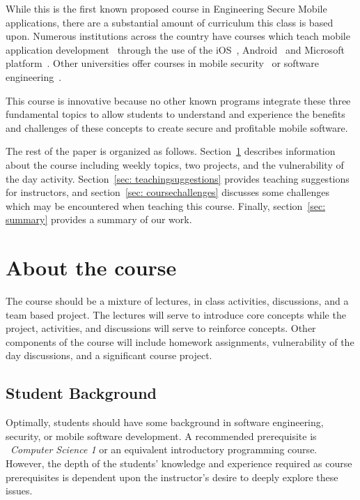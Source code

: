 \documentclass{sig-alternate}
\begin{document}
While this is the first known proposed course in Engineering Secure Mobile applications, there are a substantial amount of curriculum this class is based upon. Numerous institutions across the country have courses which teach mobile application development~\cite{mobiledevelop_11} through the use of the iOS~\cite{ios_develop_url}, Android~\cite{androiddevel_url} and Microsoft platform~\cite{mobileappdesign_url}. Other universities offer courses in mobile security~\cite{mobilesecurity_URL} or software engineering~\cite{rit_url}.

This course is innovative because no other known programs integrate these three fundamental topics to allow students to understand and experience the benefits and challenges of these concepts to create secure and profitable mobile software.

The rest of the paper is organized as follows. Section~\ref{sec: aboutcourse} describes information about the course including weekly topics, two projects, and the vulnerability of the day activity. Section~\ref{sec: teachingsuggestions} provides teaching suggestions for instructors, and section~\ref{sec: coursechallenges} discusses some challenges which may be encountered when teaching this course. Finally, section~\ref{sec: summary} provides a summary of our work.


\section{About the course}
\label{sec: aboutcourse}

The course should be a mixture of lectures, in class activities, discussions, and a team based project. The lectures will serve to introduce core concepts while the project, activities, and discussions will serve to reinforce concepts. Other components of the course will include homework assignments, vulnerability of the day discussions, and a significant course project.

\subsection{Student Background}

Optimally, students should have some background in software engineering, security, or mobile software development. A recommended prerequisite is ~\emph{Computer Science 1} or an equivalent introductory programming course. However, the depth of the students' knowledge and experience required as course prerequisites is dependent upon the instructor's desire to deeply explore these issues.
\end{document}
